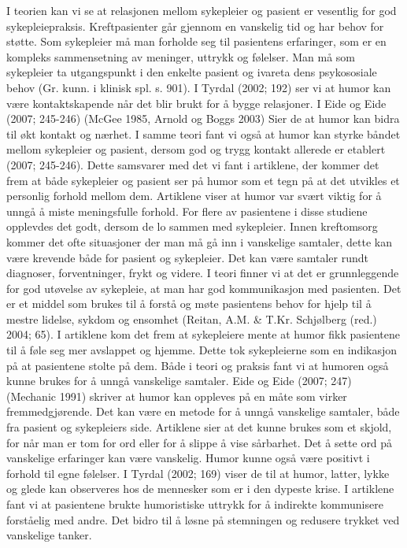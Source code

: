 I teorien kan vi se at relasjonen mellom sykepleier og pasient er vesentlig for
god sykepleiepraksis. Kreftpasienter går gjennom en vanskelig tid og har behov
for støtte. Som sykepleier må man forholde seg til pasientens erfaringer, som
er en kompleks sammensetning av meninger, uttrykk og følelser. Man må som
sykepleier ta utgangspunkt i den enkelte pasient og ivareta dens psykososiale
behov (Gr. kunn. i klinisk spl. s. 901). I Tyrdal (2002; 192) ser vi at humor
kan være kontaktskapende når det blir brukt for å bygge relasjoner. I Eide og
Eide (2007; 245-246) (McGee 1985, Arnold og Boggs 2003) Sier de at humor kan
bidra til økt kontakt og nærhet. I samme teori fant vi også at humor kan styrke
båndet mellom sykepleier og pasient, dersom god og trygg kontakt allerede er
etablert (2007; 245-246). Dette samsvarer med det vi fant i artiklene, der
kommer det frem at både sykepleier og pasient ser på humor som et tegn på at
det utvikles et personlig forhold mellom dem. Artiklene viser at humor var
svært viktig for å unngå å miste meningsfulle forhold. For flere av pasientene
i disse studiene opplevdes det godt, dersom de lo sammen med sykepleier.  Innen
kreftomsorg kommer det ofte situasjoner der man må gå inn i vanskelige
samtaler, dette kan være krevende både for pasient og sykepleier. Det kan være
samtaler rundt diagnoser, forventninger, frykt og videre. I teori finner vi at
det er grunnleggende for god utøvelse av sykepleie, at man har god
kommunikasjon med pasienten. Det er et middel som brukes til å forstå og møte
pasientens behov for hjelp til å mestre lidelse, sykdom og ensomhet (Reitan,
A.M. \&{} T.Kr. Schjølberg (red.) 2004; 65). I artiklene kom det frem at
sykepleiere mente at humor fikk pasientene til å føle seg mer avslappet og
hjemme. Dette tok sykepleierne som en indikasjon på at pasientene stolte på
dem. Både i teori og praksis fant vi at humoren også kunne brukes for å unngå
vanskelige samtaler. Eide og Eide (2007; 247) (Mechanic 1991) skriver at humor
kan oppleves på en måte som virker fremmedgjørende. Det kan være en metode for
å unngå vanskelige samtaler, både fra pasient og sykepleiers side. Artiklene
sier at det kunne brukes som et skjold, for når man er tom for ord eller for å
slippe å vise sårbarhet. Det å sette ord på vanskelige erfaringer kan være
vanskelig. Humor kunne også være positivt i forhold til egne følelser. I Tyrdal
(2002; 169) viser de til at humor, latter, lykke og glede kan observeres hos de
mennesker som er i den dypeste krise. I artiklene fant vi at pasientene brukte
humoristiske uttrykk for å indirekte kommunisere forståelig med andre. Det
bidro til å løsne på stemningen og redusere trykket ved vanskelige tanker. 

